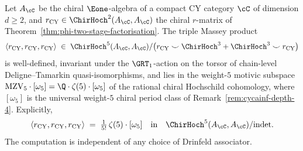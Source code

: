 \begin{theorem}
\label{thm:associator-free-deligne-tamarkin}
Let $A_\cC$ be the chiral $\Eone$-algebra of a compact CY category $\cC$ of dimension $d \geq 2$, and $r_{\mathrm{CY}} \in \ChirHoch^2(A_\cC, A_\cC)$ the chiral $r$-matrix of Theorem~\ref{thm:phi-two-stage-factorisation}. The triple Massey product
\[
\langle r_{\mathrm{CY}}, r_{\mathrm{CY}}, r_{\mathrm{CY}}\rangle \;\in\; \ChirHoch^5(A_\cC, A_\cC) / \bigl(r_{\mathrm{CY}} \smile \ChirHoch^3 + \ChirHoch^3 \smile r_{\mathrm{CY}}\bigr)
\]
is well-defined, invariant under the $\GRT_1$-action on the torsor of chain-level Deligne--Tamarkin quasi-isomorphisms, and lies in the weight-$5$ motivic subspace $\MZV_5 \cdot [\omega_5] = \Q\cdot\zeta(5)\cdot[\omega_5]$ of the rational chiral Hochschild cohomology, where $[\omega_5]$ is the universal weight-$5$ chiral period class of Remark~\ref{rem:cycainf-depth-4}. Explicitly,
\begin{equation}
\langle r_{\mathrm{CY}}, r_{\mathrm{CY}}, r_{\mathrm{CY}}\rangle \;=\; \tfrac{1}{5!}\,\zeta(5)\cdot [\omega_5] \quad\text{in}\quad \ChirHoch^5(A_\cC, A_\cC)/\mathrm{indet}.
\end{equation}
The computation is independent of any choice of Drinfeld associator.
\end{theorem}


